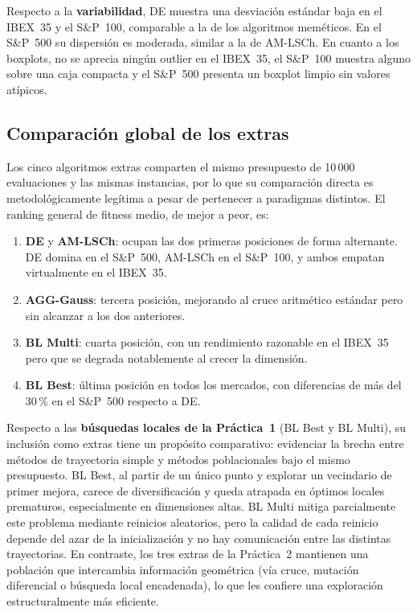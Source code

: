 Respecto a la \textbf{variabilidad}, DE muestra una desviación estándar baja en el IBEX~35 y el S\&P~100, comparable a la de los algoritmos meméticos. En el S\&P~500 su dispersión es moderada, similar a la de AM-LSCh. En cuanto a los boxplots, no se aprecia ningún outlier en el IBEX~35, el S\&P~100 muestra alguno sobre una caja compacta y el S\&P~500 presenta un boxplot limpio sin valores atípicos.

\subsection{Comparación global de los extras}

Los cinco algoritmos extras comparten el mismo presupuesto de 10\,000 evaluaciones y las mismas instancias, por lo que su comparación directa es metodológicamente legítima a pesar de pertenecer a paradigmas distintos. El ranking general de fitness medio, de mejor a peor, es:

\begin{enumerate}[noitemsep]
    \item \textbf{DE} y \textbf{AM-LSCh}: ocupan las dos primeras posiciones de forma alternante. DE domina en el S\&P~500, AM-LSCh en el S\&P~100, y ambos empatan virtualmente en el IBEX~35.
    \item \textbf{AGG-Gauss}: tercera posición, mejorando al cruce aritmético estándar pero sin alcanzar a los dos anteriores.
    \item \textbf{BL Multi}: cuarta posición, con un rendimiento razonable en el IBEX~35 pero que se degrada notablemente al crecer la dimensión.
    \item \textbf{BL Best}: última posición en todos los mercados, con diferencias de más del 30\,\% en el S\&P~500 respecto a DE.
\end{enumerate}

Respecto a las \textbf{búsquedas locales de la Práctica~1} (BL Best y BL Multi), su inclusión como extras tiene un propósito comparativo: evidenciar la brecha entre métodos de trayectoria simple y métodos poblacionales bajo el mismo presupuesto. BL Best, al partir de un único punto y explorar un vecindario de primer mejora, carece de diversificación y queda atrapada en óptimos locales prematuros, especialmente en dimensiones altas. BL Multi mitiga parcialmente este problema mediante reinicios aleatorios, pero la calidad de cada reinicio depende del azar de la inicialización y no hay comunicación entre las distintas trayectorias. En contraste, los tres extras de la Práctica~2 mantienen una población que intercambia información geométrica (vía cruce, mutación diferencial o búsqueda local encadenada), lo que les confiere una exploración estructuralmente más eficiente.

